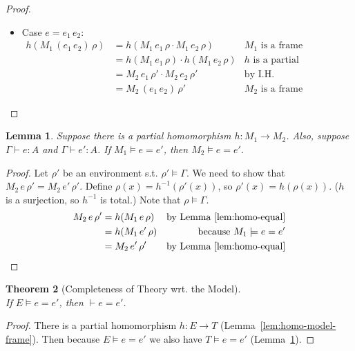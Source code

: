 \documentclass{tufte-handout}
\newcommand{\APP}[0]{\,}
\newtheorem{theorem}{Theorem}%
\newtheorem{lemma}[theorem]{Lemma}
\begin{document}
\begin{proof}
\begin{itemize}
  \item Case $e=e_1 \APP e_2$:\\
    \begin{align*}
    h(M_1\,(e_1 \APP e_2)\,\rho) 
    &= h(M_1\,e_1\,\rho \cdot M_1\,e_2\,\rho) & \text{$M_1$ is a frame} \\
    &= h(M_1\,e_1\,\rho) \cdot h(M_1\,e_2\,\rho) & \text{$h$ is a partial homomorphism}\\
    &= M_2\,e_1\,\rho' \cdot M_2\,e_2\,\rho' & \text{by I.H.}\\
    &= M_2\,(e_1 \APP e_2)\,\rho' & \text{$M_2$ is a frame}
    \end{align*}

  \end{itemize}
\end{proof}


\begin{lemma}
\label{lem:homo-models}
Suppose there is a partial homomorphism $h : M_1 \to M_2$.
Also, suppose $\Gamma \vdash e : A$ and $\Gamma \vdash e' : A$.
If $M_1 \models e = e'$, then $M_2 \models e = e'$.
\end{lemma}
\begin{proof}
  Let $\rho'$ be an environment s.t. $\rho' \models \Gamma$.  We need
  to show that $M_2\,e\,\rho' = M_2\,e'\,\rho'$.  Define $\rho(x) =
  h^{-1}(\rho'(x))$, so $\rho'(x) = h(\rho(x))$.  ($h$ is a
  surjection, so $h^{-1}$ is total.) Note that $\rho \models \Gamma$.
  \begin{align*}
    M_2\,e\,\rho' 
    &= h(M_1\,e\,\rho) & \text{by Lemma~\ref{lem:homo-equal}}\\
    &= h(M_1\,e'\,\rho) & \text{because } M_1 \models e = e'\\
    &= M_2\,e'\,\rho' & \text{by Lemma~\ref{lem:homo-equal}}
  \end{align*}
\end{proof}

\begin{theorem}[Completeness of Theory wrt. the Model]\ \\
  If $E \models e = e'$, then $\vdash e = e'$.
\end{theorem}
\begin{proof}
  There is a partial homomorphism $h : E \to T$
  (Lemma~\ref{lem:homo-model-frame}).  Then because $E \models e = e'$
  we also have $T \models e = e'$ (Lemma~\ref{lem:homo-models}).
  

\end{proof}


\end{document}
